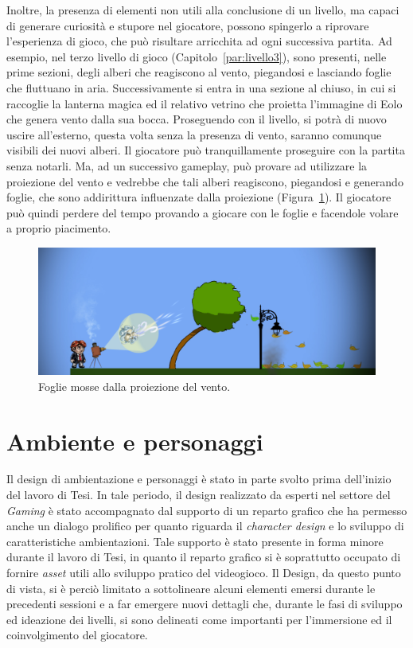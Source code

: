 Inoltre, la presenza di elementi non utili alla conclusione di un livello, ma capaci di generare curiosità e stupore nel giocatore, possono spingerlo a riprovare l’esperienza di gioco, che può risultare arricchita ad ogni successiva partita.
Ad esempio, nel terzo livello di gioco (Capitolo~\ref{par:livello3}), sono presenti, nelle prime sezioni, degli alberi che reagiscono al vento, piegandosi e lasciando foglie che fluttuano in aria. Successivamente si entra in una sezione al chiuso, in cui si raccoglie la lanterna magica ed il relativo vetrino che proietta l’immagine di Eolo che genera vento dalla sua bocca. Proseguendo con il livello, si potrà di nuovo uscire all’esterno, questa volta senza la presenza di vento, saranno comunque visibili dei nuovi alberi. Il giocatore può tranquillamente proseguire con la partita senza notarli. Ma, ad un successivo gameplay, può provare ad utilizzare la proiezione del vento e vedrebbe che tali alberi reagiscono, piegandosi e generando foglie, che sono addirittura influenzate dalla proiezione (Figura~\ref{fig:rigiocabilita_foglie}). Il giocatore può quindi perdere del tempo provando a giocare con le foglie e facendole volare a proprio piacimento.

\begin{figure}%
	\centering
	\includegraphics[width= 0.9\columnwidth]{images/gameDesign/27_foglie.jpg}
	\caption{Foglie mosse dalla proiezione del vento.}
	\label{fig:rigiocabilita_foglie}
\end{figure} 

\section{Ambiente e personaggi}
\label{sec:ambiente_personaggi}

Il design di ambientazione e personaggi è stato in parte svolto prima dell’inizio del lavoro di Tesi. In tale periodo, il design realizzato da esperti nel settore del \textit{Gaming} è stato accompagnato dal supporto di un reparto grafico che ha permesso anche un dialogo prolifico per quanto riguarda il \textit{character design} e lo sviluppo di caratteristiche ambientazioni. Tale supporto è stato presente in forma minore durante il lavoro di Tesi, in quanto il reparto grafico si è soprattutto occupato di fornire \textit{asset} utili allo sviluppo pratico del videogioco. Il Design, da questo punto di vista, si è perciò limitato a sottolineare alcuni elementi emersi durante le precedenti sessioni e a far emergere nuovi dettagli che, durante le fasi di sviluppo ed ideazione dei livelli, si sono delineati come importanti per l’immersione ed il coinvolgimento del giocatore.

